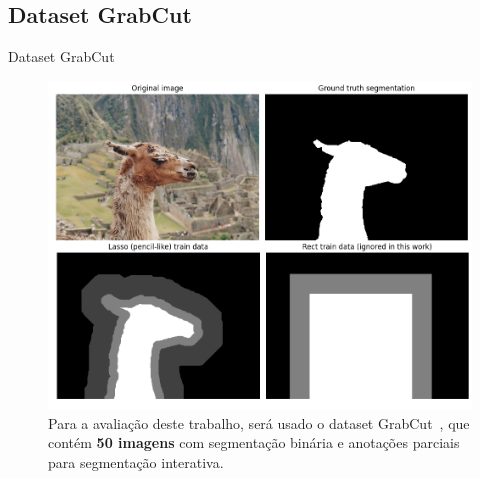\documentclass{templatebeamerufc/libs/ufc_format}
\begin{document}
\subsection{Dataset GrabCut}
\begin{frame}{Dataset GrabCut}

    \begin{figure}\label{fig:grabcut-dataset}
    \centering
    \caption{ Para a avaliação deste trabalho,
será usado o dataset GrabCut~\cite{rother2004grabcut}, que contém
\textbf{50 imagens} com segmentação binária e anotações parciais para
segmentação interativa.}
    \includegraphics[scale=0.21]{figuras/grabcut-dataset}
    \source{\fonteautor}
  \end{figure}

\end{frame}
\end{document}
